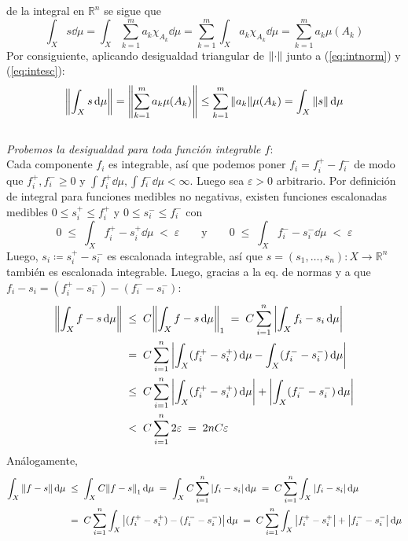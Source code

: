 \begin{sol}
{}
de la integral en $\mathbb{R}^n$ se sigue que
\begin{equation}\label{eq:intesc}
\int_X s \dd{\mu} 
= \int_X \sum^m_{k=1} a_k\chi_{A_k} \dd{\mu}
= \sum^m_{k=1} \int_X  a_k\chi_{A_k} \dd{\mu}
= \sum^m_{k=1} a_k\mu(A_k)
\end{equation}
Por consiguiente, aplicando desigualdad triangular de $\norm{\cdot}$ junto a (\ref{eq:intnorm}) y (\ref{eq:intesc}):
\[
\norm{\int_X s \dd{\mu}} 
= \norm{\sum^m_{k=1} a_k\mu(A_k)}
\leq \sum^m_{k=1}\norm{a_k}\mu({A_k})
= \int_X \norm{s} \dd{\mu}
\]
\medskip\\
\emph{Probemos la desigualdad para toda función integrable $f$}:\\
Cada componente $f_i$ es integrable, así que podemos poner $f_i = f^+_i - f^-_i$ de modo que $f_i^+,f^-_i \ge 0$ y $\int f^+_i \dd{\mu},\int f^-_i \dd{\mu}<\infty$. Luego sea $\varepsilon>0$ arbitrario. Por definición de integral para funciones medibles no negativas, existen funciones escalonadas medibles $0 \leq s^+_i \le f^+_i$ y $0 \leq s^-_i \le f^-_i$ con
\[
0 \;\leq\; \int_X f^+_i - s^+_i \dd{\mu} \;<\; \varepsilon
\qquad\text{y}\qquad
0 \;\leq\; \int_X f^-_i - s^-_i \dd{\mu} \;<\; \varepsilon
\]
Luego, $s_i \coloneq s^+_i - s^-_i$ es escalonada integrable, así que $s = (s_1,\dots,s_n) \colon X \to \mathbb{R}^n$ también es escalonada integrable. Luego, gracias a la eq. de normas y a que $f_i-s_i = (f^+_i-s^-_i)-(f^-_i-s^-_i)$:
\begin{equation}\label{eq:cotanormint}
\begin{split}
\norm{ \int_X f-s \dd{\mu} }
&\;\le\; C \norm{ \int_X f-s \dd{\mu} }_1
\;=\; C \sum^n_{i=1} \abs{ \int_Xf_i-s_i \dd{\mu} }\\
&\;=\; C \sum^n_{i=1} \abs{ \int_X(f^+_i-s^+_i)\dd{\mu} - \int_X(f^-_i-s^-_i)\dd{\mu} }\\
&\;\le\; C \sum^n_{i=1} \abs{ \int_X(f^+_i-s^+_i)\dd{\mu} } + \abs{ \int_X(f^-_i-s^-_i)\dd{\mu} }\\
&\;<\; C \sum^n_{i=1} 2\varepsilon \;=\; 2nC\varepsilon
\end{split}
\end{equation}
Análogamente,
\begin{align*}
\int_X \norm{f-s} \dd{\mu}
&\;\leq\; \int_X C\norm{f-s}_1 \dd{\mu}
\;=\; \int_X C\sum^n_{i=1} \abs{ f_i-s_i } \dd{\mu} 
\;=\; C\sum^n_{i=1} \int_X \abs{ f_i-s_i } \dd{\mu}\\
&\;=\; C\sum^n_{i=1} \int_X \abs{ (f^+_i-s^+_i) - (f^-_i - s^-_i) } \dd{\mu}
\;=\; C\sum^n_{i=1} \int_X \abs{f^+_i-s^+_i} + \abs{f^-_i - s^-_i} \dd{\mu}

\end{align*}
\end{sol}
